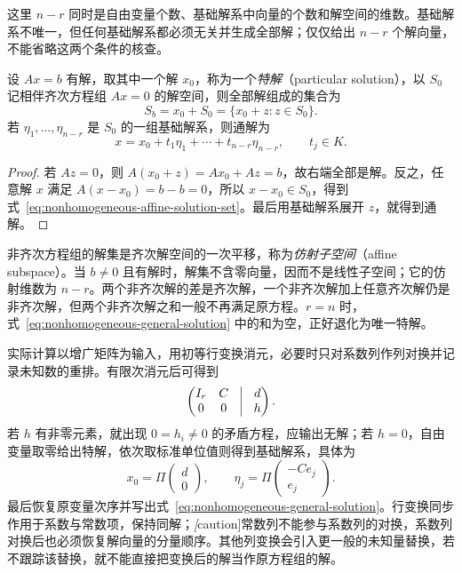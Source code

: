 这里 $n-r$ 同时是自由变量个数、基础解系中向量的个数和解空间的维数。基础解系不唯一，但任何基础解系都必须无关并生成全部解；仅仅给出 $n-r$ 个解向量，不能省略这两个条件的核查。

\begin{theorem}[非齐次方程组解的结构]
\label{thm:nonhomogeneous-solution-structure}
设 $Ax=b$ 有解，取其中一个解 $x_0$，称为一个\emph{特解}（particular solution），以 $S_0$ 记相伴齐次方程组 $Ax=0$ 的解空间，则全部解组成的集合为
\begin{equation}
\label{eq:nonhomogeneous-affine-solution-set}
    S_b=x_0+S_0=\{x_0+z:z\in S_0\}.
\end{equation}
若 $\eta_1,\ldots,\eta_{n-r}$ 是 $S_0$ 的一组基础解系，则通解为
\begin{equation}
\label{eq:nonhomogeneous-general-solution}
    x=x_0+t_1\eta_1+\cdots+t_{n-r}\eta_{n-r},\qquad t_j\in K.
\end{equation}
\end{theorem}

\begin{proof}
若 $Az=0$，则 $A(x_0+z)=Ax_0+Az=b$，故右端全部是解。反之，任意解 $x$ 满足 $A(x-x_0)=b-b=0$，所以 $x-x_0\in S_0$，得到式~\eqref{eq:nonhomogeneous-affine-solution-set}。最后用基础解系展开 $z$，就得到通解。
\end{proof}

非齐次方程组的解集是齐次解空间的一次平移，称为\emph{仿射子空间}（affine subspace）。当 $b\ne0$ 且有解时，解集不含零向量，因而不是线性子空间；它的仿射维数为 $n-r$。两个非齐次解的差是齐次解，一个非齐次解加上任意齐次解仍是非齐次解，但两个非齐次解之和一般不再满足原方程。$r=n$ 时，式~\eqref{eq:nonhomogeneous-general-solution} 中的和为空，正好退化为唯一特解。

实际计算以增广矩阵为输入，用初等行变换消元，必要时只对系数列作列对换并记录未知数的重排。有限次消元后可得到
\begin{equation}
\label{eq:linear-system-reduced-block-form}
    \begin{pmatrix}I_r&C&\vline&d\\0&0&\vline&h\end{pmatrix}.
\end{equation}
若 $h$ 有非零元素，就出现 $0=h_i\ne0$ 的矛盾方程，应输出无解；若 $h=0$，自由变量取零给出特解，依次取标准单位值则得到基础解系，具体为
\[
    x_0=\Pi\begin{pmatrix}d\\0\end{pmatrix},\qquad
    \eta_j=\Pi\begin{pmatrix}-Ce_j\\e_j\end{pmatrix}.
\]
最后恢复原变量次序并写出式~\eqref{eq:nonhomogeneous-general-solution}。行变换同步作用于系数与常数项，保持同解；\emph[caution]{常数列不能参与系数列的对换，系数列对换后也必须恢复解向量的分量顺序}。其他列变换会引入更一般的未知量替换，若不跟踪该替换，就不能直接把变换后的解当作原方程组的解。


